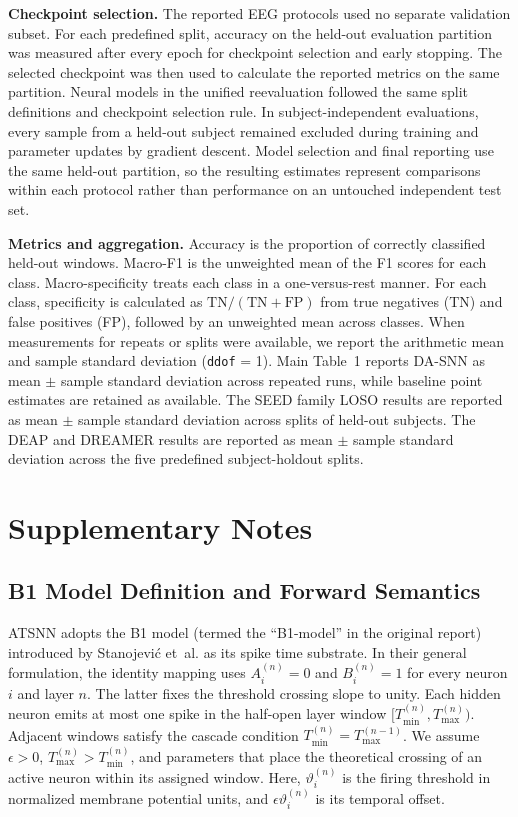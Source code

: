 \documentclass[12pt]{article}
\providecommand{\DIFaddtex}[1]{{\protect\color{blue}\sf #1}}
\providecommand{\DIFadd}[1]{\texorpdfstring{\DIFaddtex{#1}}{#1}}
\providecommand{\DIFaddbegin}{}
\providecommand{\DIFaddend}{}
\begin{document}
 \DIFaddbegin \DIFadd{\textbf{Checkpoint selection.}
The reported EEG protocols used no separate validation subset. For each predefined split, accuracy on the held-out evaluation partition was measured after every epoch for checkpoint selection and early stopping. The selected checkpoint was then used to calculate the reported metrics on the same partition. Neural models in the unified reevaluation followed the same split definitions and checkpoint selection rule. In subject-independent evaluations, every sample from a held-out subject remained excluded during training and parameter updates by gradient descent. Model selection and final reporting use the same held-out partition, so the resulting estimates represent comparisons within each protocol rather than performance on an untouched independent test set.
}

\DIFadd{\textbf{Metrics and aggregation.}
Accuracy is the proportion of correctly classified held-out windows}\DIFaddend .  \DIFaddbegin \DIFadd{Macro-F1 is the unweighted mean of the F1 scores for each class. Macro-specificity treats each class in a one-versus-rest manner. For each class, specificity is calculated as $\mathrm{TN}/(\mathrm{TN}+\mathrm{FP})$ from true negatives (TN) and false positives (FP), followed by an unweighted mean across classes. When measurements for repeats or splits were available, we report the arithmetic mean and sample standard deviation (\texttt{ddof} = 1). Main Table~1 reports DA-SNN as mean $\pm$ sample standard deviation across repeated runs, while baseline point estimates are retained as available. The SEED family LOSO results are reported as mean $\pm$ sample standard deviation across splits of held-out subjects. The DEAP and DREAMER results are reported as mean $\pm$ sample standard deviation across the five predefined subject-holdout splits.
}\section{\DIFadd{Supplementary Notes}}

\subsection{\DIFadd{B1 Model Definition and Forward Semantics}}

\DIFadd{ATSNN adopts the B1 model (termed the ``B1-model'' in the original report) introduced by Stanojevi\'{c} et~al. \cite{ref46} as its spike time substrate. In their general formulation, the identity mapping uses $A_i^{(n)}=0$ and $B_i^{(n)}=1$ for every neuron }\DIFaddend $i$  \DIFaddbegin \DIFadd{and layer }\DIFaddend $n$\DIFaddbegin \DIFadd{. The latter fixes the threshold crossing slope to unity. Each hidden neuron emits at most one spike in the half-open layer window $[T_{\min}^{(n)},T_{\max}^{(n)})$. Adjacent windows satisfy the cascade condition $T_{\min}^{(n)}=T_{\max}^{(n-1)}$. We assume $\epsilon>0$, $T_{\max}^{(n)}>T_{\min}^{(n)}$, and parameters that place the theoretical crossing of an active neuron within its assigned window. Here, $\vartheta_i^{(n)}$ is the firing threshold in normalized membrane potential units, and $\epsilon\vartheta_i^{(n)}$ is its temporal offset.
}
\end{document}
